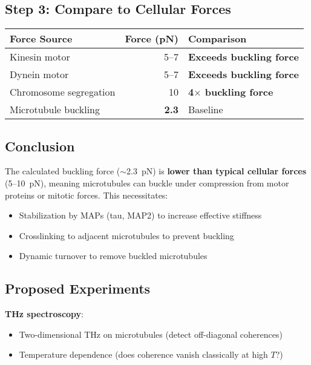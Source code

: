 \subsection*{Step 3: Compare to Cellular Forces}

\begin{center}
\begin{tabular}{@{}lrl@{}}
\toprule
Force Source & \multicolumn{1}{c}{Force (pN)} & Comparison \\
\midrule
Kinesin motor & 5--7 & \textbf{Exceeds buckling force} \\
Dynein motor & 5--7 & \textbf{Exceeds buckling force} \\
Chromosome segregation & 10 & \textbf{4$\times$ buckling force} \\
Microtubule buckling & \textbf{2.3} & Baseline \\
\bottomrule
\end{tabular}
\end{center}

\subsection*{Conclusion}

The calculated buckling force ($\sim$2.3~pN) is \textbf{lower than typical cellular forces} (5--10~pN), meaning microtubules can buckle under compression from motor proteins or mitotic forces. This necessitates:
\begin{itemize}
\item Stabilization by MAPs (tau, MAP2) to increase effective stiffness
\item Crosslinking to adjacent microtubules to prevent buckling
\item Dynamic turnover to remove buckled microtubules
\end{itemize}

\subsection{Proposed Experiments}
\label{subsec:proposed-experiments}

\textbf{THz spectroscopy}:
\begin{itemize}
\item Two-dimensional THz on microtubules (detect off-diagonal coherences)
\item Temperature dependence (does coherence vanish classically at high $T$?)
\end{itemize}

